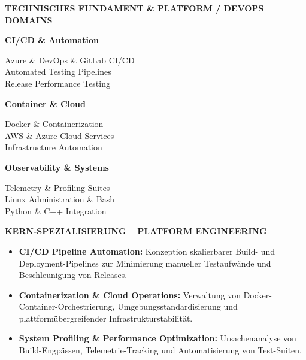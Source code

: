 \documentclass[10pt,a4paper]{article}
\begin{document}
\colorbox{primary!10}{%
\parbox{\dimexpr\textwidth-2\fboxsep\relax}{%
    \vspace{0.10cm}
    \centering
    {\bfseries\color{primary} TECHNISCHES FUNDAMENT \& PLATFORM / DEVOPS DOMAINS\par}
    \vspace{0.08cm}

    \begin{minipage}[t]{0.31\linewidth}
        \raggedright
        \textbf{\color{primary}CI/CD \& Automation}\par
        Azure \& DevOps \& GitLab CI/CD\\
        Automated Testing Pipelines\\
        Release Performance Testing
    \end{minipage}
    \hfill
    \begin{minipage}[t]{0.31\linewidth}
        \raggedright
        \textbf{\color{primary}Container \& Cloud}\par
        Docker \& Containerization\\
        AWS \& Azure Cloud Services\\
        Infrastructure Automation
    \end{minipage}
    \hfill
    \begin{minipage}[t]{0.31\linewidth}
        \raggedright
        \textbf{\color{primary}Observability \& Systems}\par
        Telemetry \& Profiling Suites\\
        Linux Administration \& Bash\\
        Python \& C++ Integration
    \end{minipage}

    \vspace{0.08cm}
}%
}

\vspace{0.15cm}

{\centering
\colorbox{accent!25}{%
\parbox{\dimexpr\textwidth-25\fboxsep\relax}{%
    \vspace{0.08cm}
    \centering
    {\bfseries\color{primary}KERN-SPEZIALISIERUNG -- PLATFORM ENGINEERING\par}
    \vspace{0.05cm}
    \raggedright
    \begin{itemize}[leftmargin=1.5em, itemsep=0.15em, topsep=0.15em]
        \item \textbf{\color{primary}CI/CD Pipeline Automation:} Konzeption skalierbarer Build- und Deployment-Pipelines zur Minimierung manueller Testaufwände und Beschleunigung von Releases.
        \item \textbf{\color{primary}Containerization \& Cloud Operations:} Verwaltung von Docker-Container-Orchestrierung, Umgebungsstandardisierung und plattformübergreifender Infrastrukturstabilität.
        \item \textbf{\color{primary}System Profiling \& Performance Optimization:} Ursachenanalyse von Build-Engpässen, Telemetrie-Tracking und Automatisierung von Test-Suiten.
    \end{itemize}
    \vspace{0.05cm}
}%
}\par}
\end{document}

